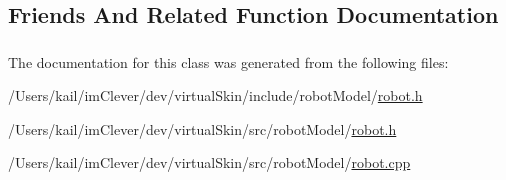 \subsection{Friends And Related Function Documentation}
\hypertarget{class_robot_model_1_1_robot_a3dae6d594db374d61cfe7a7701326056}{
\subsubsection[{KinTreeNode}]{}}
\label{class_robot_model_1_1_robot_a3dae6d594db374d61cfe7a7701326056}


The documentation for this class was generated from the following files:\begin{DoxyCompactItemize}
\item 
/Users/kail/imClever/dev/virtualSkin/include/robotModel/\hyperlink{include_2robot_model_2robot_8h}{robot.h}\item 
/Users/kail/imClever/dev/virtualSkin/src/robotModel/\hyperlink{src_2robot_model_2robot_8h}{robot.h}\item 
/Users/kail/imClever/dev/virtualSkin/src/robotModel/\hyperlink{robot_8cpp}{robot.cpp}\end{DoxyCompactItemize}
